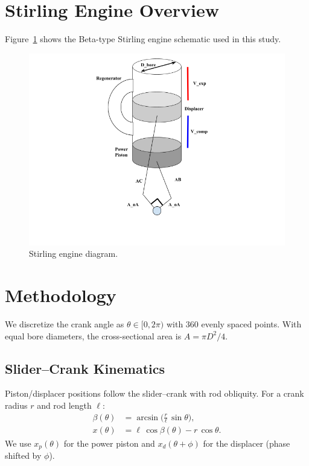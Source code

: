 \documentclass[12pt]{article}
\begin{document}
\section{Stirling Engine Overview}
Figure~\ref{fig:stirling} shows the Beta-type Stirling engine schematic used in this study.
\begin{figure}[H]
  \centering
  \includegraphics[width=0.9\linewidth]{figures/stirling.png}
  \caption{Stirling engine diagram.}
  \label{fig:stirling}
\end{figure}
\section{Methodology}
We discretize the crank angle as \(\theta \in [0,2\pi)\) with 360 evenly spaced points. With equal bore diameters, the cross-sectional area is \(A = \pi D^{2}/4\).

\subsection{Slider--Crank Kinematics}
Piston/displacer positions follow the slider--crank with rod obliquity. For a crank radius \(r\) and rod length \(\ell\):
\begin{align}
  \beta(\theta) &= \arcsin\!\biggl( \frac{r}{\ell}\,\sin\theta \biggr),\label{eq:beta-def}\\
  x(\theta) &= \ell\,\cos\beta(\theta) - r\,\cos\theta.
\end{align}
We use \(x_{p}(\theta)\) for the power piston and \(x_{d}(\theta+\phi)\) for the displacer (phase shifted by \(\phi\)).
\end{document}
